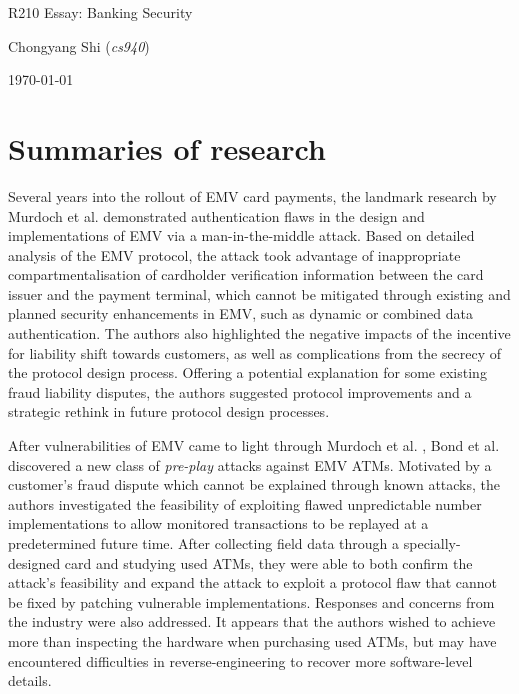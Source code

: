\documentclass[11pt]{article}
\begin{document}
\centerline{\Large R210 Essay:  Banking Security}
\vspace{2em}
\centerline{\large Chongyang Shi (\emph{cs940})}
\vspace{1em}
\centerline{\large \today}
\vspace{1em}

\section{Summaries of research}

Several years into the rollout of EMV card payments, the landmark research by Murdoch et al. \cite{murdoch2010chip} demonstrated authentication flaws in the design and implementations of EMV via a man-in-the-middle attack. Based on detailed analysis of the EMV protocol, the attack took advantage of inappropriate compartmentalisation of cardholder verification information between the card issuer and the payment terminal, which cannot be mitigated through existing and planned security enhancements in EMV, such as dynamic or combined data authentication. The authors also highlighted the negative impacts of the incentive for liability shift towards customers, as well as complications from the secrecy of the protocol design process. Offering a potential explanation for some existing fraud liability disputes, the authors suggested protocol improvements and a strategic rethink in future protocol design processes.

After vulnerabilities of EMV came to light through Murdoch et al. \cite{murdoch2010chip}, Bond et al. \cite{bond2014chip} discovered a new class of \emph{pre-play} attacks against EMV ATMs. Motivated by a customer's fraud dispute which cannot be explained through known attacks, the authors investigated the feasibility of exploiting flawed unpredictable number implementations to allow monitored transactions to be replayed at a predetermined future time. After collecting field data through a specially-designed card and studying used ATMs, they were able to both confirm the attack's feasibility and expand the attack to exploit a protocol flaw that cannot be fixed by patching vulnerable implementations. Responses and concerns from the industry were also addressed. It appears that the authors wished to achieve more than inspecting the hardware when purchasing used ATMs, but may have encountered difficulties in reverse-engineering to recover more software-level details.
\end{document}
